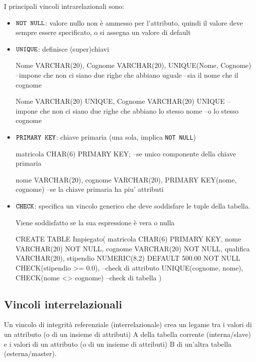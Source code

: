 I principali vincoli intrarelazionali sono:
\begin{itemize}[label=$\diamond$, itemsep=\medskipamount]
  \item $\verb|NOT NULL|$: valore nullo non è ammesso per l'attributo, quindi il valore deve sempre essere specificato, o si assegna un valore di default
  \item $\verb|UNIQUE|$: definisce (super)chiavi
\begin{codiceSQL}
Nome VARCHAR(20),
Cognome VARCHAR(20),
UNIQUE(Nome, Cognome)
--impone che non ci siano due righe che abbiano uguale
--sia il nome che il cognome
\end{codiceSQL}

\begin{codiceSQL}
Nome VARCHAR(20) UNIQUE,
Cognome VARCHAR(20) UNIQUE
--impone che non ci siano due righe che abbiano lo stesso nome
--o lo stesso cognome 
\end{codiceSQL}
  \item $\verb|PRIMARY KEY|$: chiave primaria (una sola, implica \texttt{NOT NULL}) 
\begin{codiceSQL}
matricola CHAR(6) PRIMARY KEY;
--se unico componente della chiave primaria
\end{codiceSQL}

\begin{codiceSQL}
nome VARCHAR(20),
cognome VARCHAR(20),
PRIMARY KEY(nome, cognome)
--se la chiave primaria ha piu' attributi
\end{codiceSQL}
  \item $\verb|CHECK|$: specifica un vincolo generico che deve soddisfare le tuple della tabella. 
  
  Viene soddisfatto se la sua espressione è vera o nulla
\begin{codiceSQL}
CREATE TABLE Impiegato(
matricola CHAR(6) PRIMARY KEY,
nome VARCHAR(20) NOT NULL,
cognome VARCHAR(20) NOT NULL,
qualifica VARCHAR(20),
stipendio NUMERIC(8,2) DEFAULT 500.00 NOT NULL
CHECK(stipendio >= 0.0),    --check di attributo
UNIQUE(cognome, nome),
CHECK(nome <> cognome)      --check di tabella
)
\end{codiceSQL}
\end{itemize}

\subsection{Vincoli interrelazionali}
Un vincolo di integrità referenziale (interrelazionale) crea un legame tra i valori di un attributo (o di un insieme di attributi) A della tabella corrente (interna/slave) e i valori di un attributo (o di un insieme di attributi) B di un'altra tabella (esterna/master).

